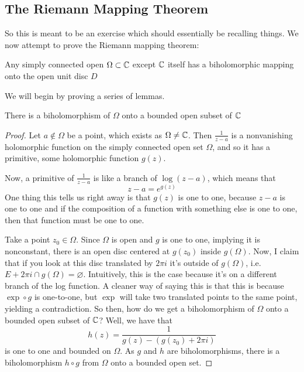\documentclass{article}
\begin{document}
\subsection{The Riemann Mapping Theorem}

So this is meant to be an exercise which should essentially be recalling things. We now attempt to prove the Riemann mapping theorem:
\begin{theorem}
Any simply connected open \(\Omega \subset \mathbb{C}\) except \(\mathbb{C}\) itself has a biholomorphic mapping onto the open unit disc \(D\)
\end{theorem}
We will begin by proving a series of lemmas.
\begin{lemma}
There is a biholomorphism of \(\Omega\) onto a bounded open subset of \(\mathbb{C}\)
\end{lemma}
\begin{proof}
Let \(a \notin \Omega\) be a point, which exists as \(\Omega \neq \mathbb{C}\). Then \(\frac{1}{z - a}\) is a nonvanishing holomorphic function on the simply connected open set \(\Omega\), and so it has a primitive, some holomorphic function \(g(z)\).

Now, a primitive of \(\frac{1}{z - a}\) is like a branch of \(\log(z - a)\), which means that
\begin{equation}z - a = e^{g(z)}\end{equation}
One thing this tells us right away is that \(g(z)\) is one to one, because \(z - a\) is one to one and if the composition of a function with something else is one to one, then that function must be one to one.

Take a point \(z_0 \in \Omega\). Since \(\Omega\) is open and \(g\) is one to one, implying it is nonconstant, there is an open disc centered at \(g(z_0)\) inside \(g(\Omega)\). Now, I claim that if you look at this disc translated by \(2\pi i\) it's outside of \(g(\Omega)\), i.e. \(E + 2\pi i \cap g(\Omega) = \varnothing\). Intuitively, this is the case because it's on a different branch of the log function. A cleaner way of saying this is that this is because \(\exp \circ g\) is one-to-one, but \(\exp\) will take two translated points to the same point, yielding a contradiction.
So then, how do we get a biholomorphism of \(\Omega\) onto a bounded open subset of \(\mathbb{C}\)? Well, we have that
\begin{equation}h(z) = \frac{1}{g(z) - (g(z_0) + 2\pi i)}\end{equation}
is one to one and bounded on \(\Omega\). As \(g\) and \(h\) are biholomorphisms, there is a biholomorphism \(h \circ g\) from \(\Omega\) onto a bounded open set.
\end{proof}
\end{document}
